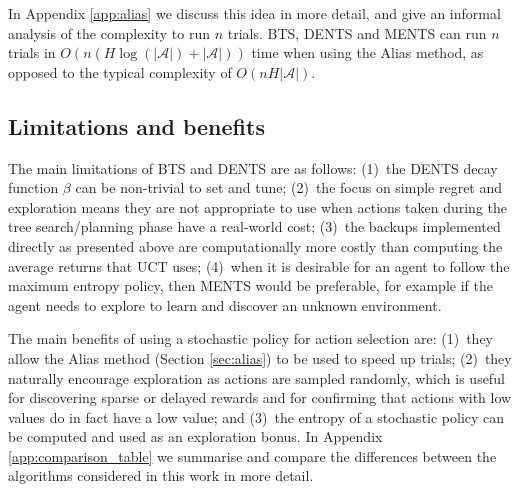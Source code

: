 \documentclass{article}
\newcommand{\todo}[1]{\hl{TODO: #1}}
\newcommand{\cl}[1]{\mathcal{#1}}
\theoremstyle{plain}
\begin{document}
    		In Appendix \ref{app:alias} we discuss this idea in more detail, and give an informal analysis of the complexity to run $n$ trials. BTS, DENTS and MENTS can run $n$ trials in $O(n(H\log(|\cl{A}|)+|\cl{A}|))$ time when using the Alias method, as opposed to the typical complexity of $O(nH|\cl{A}|)$.

    \subsection{Limitations and benefits}
    		The main limitations of BTS and DENTS are as follows: (1)~the DENTS decay function $\beta$ can be non-trivial to set and tune; (2)~the focus on simple regret and exploration means they are not appropriate to use when actions taken during the tree search/planning phase have a real-world cost; (3)~the backups implemented directly as presented above are computationally more costly than computing the average returns that UCT uses; (4)~when it is desirable for an agent to follow the maximum entropy policy, then MENTS would be preferable, for example if the agent needs to explore to learn and discover an unknown environment.
    		
    		The main benefits of using a stochastic policy for action selection are: (1)~they allow the Alias method (Section \ref{sec:alias}) to be used to speed up trials; (2)~they naturally encourage exploration as actions are sampled randomly, which is useful for discovering sparse or delayed rewards and for confirming that actions with low values do in fact have a low value; and (3)~the entropy of a stochastic policy can be computed and used as an exploration bonus. In Appendix \ref{app:comparison_table} we summarise and compare the differences between the algorithms considered in this work in more detail.
    		
\end{document}
